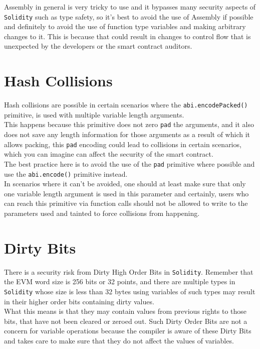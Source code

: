 Assembly in general is very tricky to use and it bypasses many security aspects of \texttt{Solidity} such as type safety, so it's best to avoid the use of Assembly if possible and definitely to avoid the use of function type variables and making arbitrary changes to it. This is because that could result in changes to control flow that is unexpected by the developers or the smart contract auditors.

\section{Hash Collisions}

Hash collisions are possible in certain scenarios where the \texttt{abi.encodePacked()} primitive, is used with multiple variable length arguments. \\

This happens because this primitive does not zero \texttt{pad} the arguments, and it also does not save any length information for those arguments as a result of which it allows packing, this \texttt{pad} encoding could lead to collisions in certain scenarios, which you can imagine can affect the security of the smart contract.\\

The best practice here is to avoid the use of the \texttt{pad} primitive where possible and use the \texttt{abi.encode()} primitive instead. \\

In scenarios where it can't be avoided, one should at least make sure that only one variable length argument is used in this parameter and certainly, users who can reach this primitive via function calls should not be allowed to write to the parameters used and tainted to force collisions from happening.

\section{Dirty Bits}
There is a security risk from Dirty High Order Bits in \texttt{Solidity}. Remember that the EVM word size is 256 bits or 32 points, and there are multiple types in \texttt{Solidity} whose size is less than 32 bytes using variables of such types may result in their higher order bits containing dirty values.\\

What this means is that they may contain values from previous rights to those bits, that have not been cleared or zeroed out. Such Dirty Order Bits are not a concern for variable operations because the compiler is aware of these Dirty Bits and takes care to make sure that they do not affect the values of variables. \\

